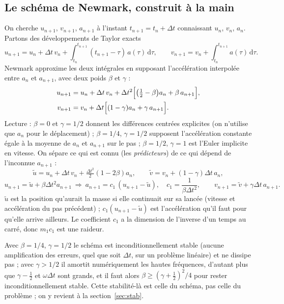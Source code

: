\documentclass[11pt,a4paper]{article}
\newcommand{\dd}{\mathrm{d}}
\begin{document}
\subsection{Le schéma de Newmark, construit à la main}
On cherche $u_{n+1}$, $v_{n+1}$, $a_{n+1}$ à l'instant $t_{n+1} = t_n+\Delta t$ connaissant
$u_n$, $v_n$, $a_n$. Partons des développements de Taylor exacts
\begin{equation}
  u_{n+1} = u_n + \Delta t\,v_n + \int_{t_n}^{t_{n+1}}(t_{n+1}-\tau)\,a(\tau)\,\dd\tau,\qquad
  v_{n+1} = v_n + \int_{t_n}^{t_{n+1}}a(\tau)\,\dd\tau .
\end{equation}
Newmark approxime les deux intégrales en supposant l'accélération interpolée entre $a_n$ et
$a_{n+1}$, avec deux poids $\beta$ et $\gamma$ :
\begin{align}
  u_{n+1} &= u_n + \Delta t\,v_n + \Delta t^2\Bigl[\bigl(\tfrac12-\beta\bigr)a_n + \beta\,a_{n+1}\Bigr],\\
  v_{n+1} &= v_n + \Delta t\Bigl[(1-\gamma)a_n + \gamma\,a_{n+1}\Bigr].
\end{align}
Lecture : $\beta = 0$ et $\gamma = 1/2$ donnent les différences centrées explicites (on n'utilise
que $a_n$ pour le déplacement) ; $\beta = 1/4$, $\gamma = 1/2$ supposent l'accélération constante
égale à la moyenne de $a_n$ et $a_{n+1}$ sur le pas ; $\beta = 1/2$, $\gamma = 1$ est l'Euler implicite
en vitesse. On sépare ce qui est connu (les \emph{prédicteurs}) de ce qui dépend de l'inconnue
$a_{n+1}$ :
\begin{equation}
  \tilde u = u_n + \Delta t\,v_n + \tfrac{\Delta t^2}{2}(1-2\beta)a_n,\qquad
  \tilde v = v_n + (1-\gamma)\Delta t\,a_n,
\end{equation}
\begin{equation}
  u_{n+1} = \tilde u + \beta\Delta t^2a_{n+1}
  \ \Longrightarrow\
  a_{n+1} = c_1\,(u_{n+1}-\tilde u),\quad c_1 = \frac{1}{\beta\Delta t^2},\qquad
  v_{n+1} = \tilde v + \gamma\Delta t\,a_{n+1}.
\end{equation}
$\tilde u$ est la position qu'aurait la masse si elle continuait sur sa lancée (vitesse et
accélération du pas précédent) ; $c_1(u_{n+1}-\tilde u)$ est l'accélération qu'il faut pour
qu'elle arrive ailleurs. Le coefficient $c_1$ a la dimension de l'inverse d'un temps au carré,
donc $m_1c_1$ est une raideur.

Avec $\beta = 1/4$, $\gamma = 1/2$ le schéma est inconditionnellement stable (aucune amplification
des erreurs, quel que soit $\Delta t$, sur un problème linéaire) et ne dissipe pas ; avec
$\gamma > 1/2$ il amortit numériquement les hautes fréquences, d'autant plus que $\gamma-\tfrac12$
et $\omega\Delta t$ sont grands, et il faut alors $\beta \ge (\gamma+\tfrac12)^2/4$ pour rester
inconditionnellement stable. Cette stabilité-là est celle du schéma, pas celle du problème ; on
y revient à la section~\ref{sec:stab}.
\end{document}
